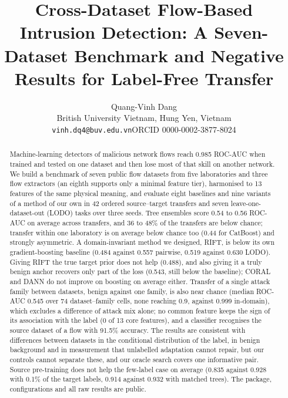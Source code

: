 \documentclass[11pt]{article}
\title{Cross-Dataset Flow-Based Intrusion Detection: A Seven-Dataset Benchmark and Negative Results for Label-Free Transfer}
\author{Quang-Vinh Dang\\
British University Vietnam, Hung Yen, Vietnam\\
\texttt{vinh.dq4@buv.edu.vn}\quad ORCID 0000-0002-3877-8024}
\date{}
\begin{document}
\maketitle

\begin{abstract}
Machine-learning detectors of malicious network flows reach 0.985 ROC-AUC when trained and tested on one dataset and then lose most of that skill on another network.
We build a benchmark of seven public flow datasets from five laboratories and three flow extractors (an eighth supports only a minimal feature tier), harmonised to 13 features of the same physical meaning, and evaluate eight baselines and nine variants of a method of our own in 42 ordered source--target transfers and seven leave-one-dataset-out (LODO) tasks over three seeds.
Tree ensembles score 0.54 to 0.56 ROC-AUC on average across transfers, and 36 to 48\% of the transfers are below chance; transfer within one laboratory is on average below chance too (0.44 for CatBoost) and strongly asymmetric.
A domain-invariant method we designed, RIFT, is below its own gradient-boosting baseline (0.484 against 0.557 pairwise, 0.519 against 0.630 LODO).
Giving RIFT the true target prior does not help (0.488), and also giving it a truly benign anchor recovers only part of the loss (0.543, still below the baseline); CORAL and DANN do not improve on boosting on average either.
Transfer of a single attack family between datasets, benign against one family, is also near chance (median ROC-AUC 0.545 over 74 dataset--family cells, none reaching 0.9, against 0.999 in-domain), which excludes a difference of attack mix alone; no common feature keeps the sign of its association with the label (0 of 13 core features), and a classifier recognises the source dataset of a flow with 91.5\% accuracy.
The results are consistent with differences between datasets in the conditional distribution of the label, in benign background and in measurement that unlabelled adaptation cannot repair, but our controls cannot separate these, and our oracle search covers one informative pair.
Source pre-training does not help the few-label case on average (0.835 against 0.928 with 0.1\% of the target labels, 0.914 against 0.932 with matched trees).
The package, configurations and all raw results are public.
\end{abstract}
\end{document}
